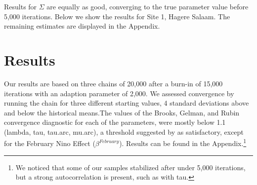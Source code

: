 \documentclass[11pt]{article}
\begin{document}





Results for $\Sigma$ are equally as good, converging to the true parameter value before 5,000 iterations. Below we show the results for Site 1, Hagere Salaam. The remaining estimates are displayed in the Appendix. 






\section{Results}\label{sec:results}

Our results are based on three chains of 20,000 after a burn-in of 15,000 iterations with an adaption parameter of 2,000. We assessed convergence by running the chain for three different starting values, 4 standard deviations above and below the historical means.The values of the Brooks, Gelman, and Rubin convergence diagnostic for each of the parameters, were mostly below 1.1 (lambda, tau, tau.arc, mu.arc), a threshold suggested by \cite{Gamerman1997} as satisfactory, except for the February Nino Effect ($\beta^{February}$). Results can be found in the Appendix.\footnote{We noticed that some of our samples stabilized after under 5,000 iterations, but a strong autocorrelation is present, such as with tau.}  
\end{document}
